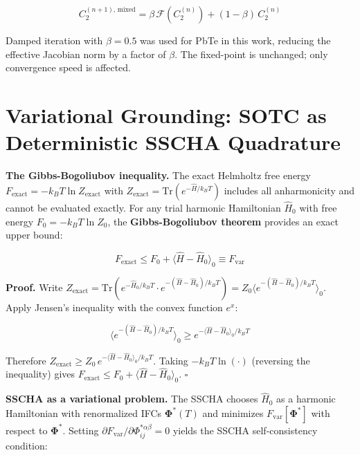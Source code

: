 \documentclass[aps,prb,reprint,amsmath,amssymb,floatfix]{revtex4-2}
\begin{document}
\begin{equation*}
C_2^{(n+1),\,\text{mixed}} = \beta\,\mathcal{F}(C_2^{(n)}) + (1-\beta)\,C_2^{(n)}
\end{equation*}

Damped iteration with \(\beta = 0.5\) was used for PbTe in this work,
reducing the effective Jacobian norm by a factor of \(\beta\). The
fixed-point is unchanged; only convergence speed is affected.


\section{Variational Grounding: SOTC as Deterministic
SSCHA
Quadrature}\label{appendix-g-variational-grounding-sotc-as-deterministic-sscha-quadrature}

\textbf{The Gibbs-Bogoliubov inequality.} The exact Helmholtz free
energy \(F_\text{exact} = -k_BT\ln Z_\text{exact}\) with
\(Z_\text{exact} = \mathrm{Tr}(e^{-\hat{H}/k_BT})\) includes all
anharmonicity and cannot be evaluated exactly. For any trial harmonic
Hamiltonian \(\hat{H}_0\) with free energy \(F_0 = -k_BT\ln Z_0\), the
\textbf{Gibbs-Bogoliubov theorem} provides an exact upper bound:

\begin{equation*}
\boxed{F_\text{exact} \leq F_0 + \langle\hat{H}-\hat{H}_0\rangle_0 \equiv F_\text{var}}
\end{equation*}

\textbf{Proof.} Write
\(Z_\text{exact} = \mathrm{Tr}(e^{-\hat{H}_0/k_BT}\cdot e^{-(\hat{H}-\hat{H}_0)/k_BT}) = Z_0\langle e^{-(\hat{H}-\hat{H}_0)/k_BT}\rangle_0\).
Apply Jensen's inequality with the convex function \(e^x\):

\begin{equation*}
\langle e^{-(\hat{H}-\hat{H}_0)/k_BT}\rangle_0 \geq e^{-\langle\hat{H}-\hat{H}_0\rangle_0/k_BT}
\end{equation*}

Therefore
\(Z_\text{exact} \geq Z_0\,e^{-\langle\hat{H}-\hat{H}_0\rangle_0/k_BT}\).
Taking \(-k_BT\ln(\cdot)\) (reversing the inequality) gives
\(F_\text{exact} \leq F_0 + \langle\hat{H}-\hat{H}_0\rangle_0\).
\(\square\)

\textbf{SSCHA as a variational problem.} The SSCHA \cite{ref7,ref8}
chooses \(\hat{H}_0\) as a harmonic Hamiltonian with renormalized IFCs
\(\boldsymbol{\Phi}^*(T)\) and minimizes
\(F_\text{var}[\boldsymbol{\Phi}^*]\) with respect to
\(\boldsymbol{\Phi}^*\). Setting
\(\partial F_\text{var}/\partial\Phi_{ij}^{*\alpha\beta} = 0\) yields
the SSCHA self-consistency condition:
\end{document}
